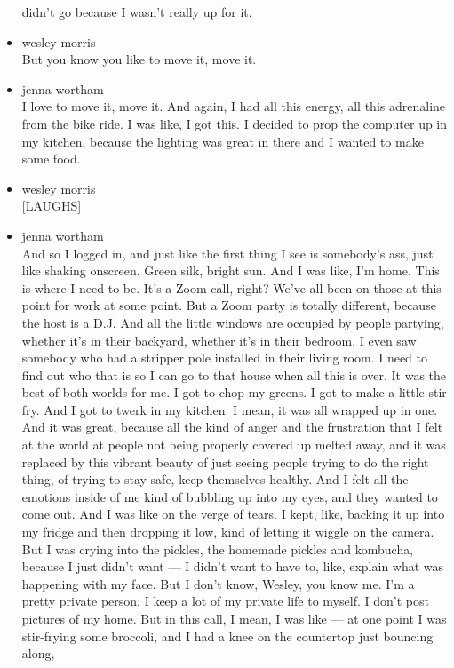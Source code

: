 \begin{itemize}
  didn't go because I wasn't really up for it.
\item
  wesley morris\\
  But you know you like to move it, move it.
\item
  jenna wortham\\
  I love to move it, move it. And again, I had all this energy, all this
  adrenaline from the bike ride. I was like, I got this. I decided to
  prop the computer up in my kitchen, because the lighting was great in
  there and I wanted to make some food.
\item
  wesley morris\\
  {[}LAUGHS{]}
\item
  jenna wortham\\
  And so I logged in, and just like the first thing I see is somebody's
  ass, just like shaking onscreen. Green silk, bright sun. And I was
  like, I'm home. This is where I need to be. It's a Zoom call, right?
  We've all been on those at this point for work at some point. But a
  Zoom party is totally different, because the host is a D.J. And all
  the little windows are occupied by people partying, whether it's in
  their backyard, whether it's in their bedroom. I even saw somebody who
  had a stripper pole installed in their living room. I need to find out
  who that is so I can go to that house when all this is over. It was
  the best of both worlds for me. I got to chop my greens. I got to make
  a little stir fry. And I got to twerk in my kitchen. I mean, it was
  all wrapped up in one. And it was great, because all the kind of anger
  and the frustration that I felt at the world at people not being
  properly covered up melted away, and it was replaced by this vibrant
  beauty of just seeing people trying to do the right thing, of trying
  to stay safe, keep themselves healthy. And I felt all the emotions
  inside of me kind of bubbling up into my eyes, and they wanted to come
  out. And I was like on the verge of tears. I kept, like, backing it up
  into my fridge and then dropping it low, kind of letting it wiggle on
  the camera. But I was crying into the pickles, the homemade pickles
  and kombucha, because I just didn't want --- I didn't want to have to,
  like, explain what was happening with my face. But I don't know,
  Wesley, you know me. I'm a pretty private person. I keep a lot of my
  private life to myself. I don't post pictures of my home. But in this
  call, I mean, I was like --- at one point I was stir-frying some
  broccoli, and I had a knee on the countertop just bouncing along,

\end{itemize}

